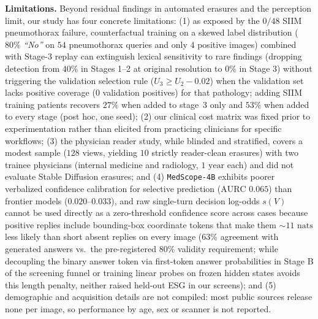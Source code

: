 \documentclass[5p,times,twocolumn,authoryear]{elsarticle}
\begin{document}
\textbf{Limitations.} Beyond residual findings in automated erasures and the perception limit, our study has four concrete limitations: (1) as exposed by the $0/48$ SIIM pneumothorax failure, counterfactual training on a skewed label distribution ($80\%$ \emph{``No''} on $54$ pneumothorax queries and only $4$ positive images) combined with Stage-3 replay can extinguish lexical sensitivity to rare findings (dropping detection from $40\%$ in Stages 1--2 at original resolution to $0\%$ in Stage 3) without triggering the validation selection rule ($U_3 \ge U_2 - 0.02$) when the validation set lacks positive coverage ($0$ validation positives) for that pathology; adding SIIM training patients recovers $27\%$ when added to stage~3 only and $53\%$ when added to every stage (post hoc, one seed); (2) our clinical cost matrix was fixed prior to experimentation rather than elicited from practicing clinicians for specific workflows; (3) the physician reader study, while blinded and stratified, covers a modest sample ($128$ views, yielding $10$ strictly reader-clean erasures) with two trainee physicians (internal medicine and radiology, $1\text{ year}$ each) and did not evaluate Stable Diffusion erasures; and (4) \texttt{MedScope-4B} exhibits poorer verbalized confidence calibration for selective prediction ($\text{AURC } 0.065$) than frontier models ($0.020\text{--}0.033$), and raw single-turn decision log-odds $s(V)$ cannot be used directly as a zero-threshold confidence score across cases because positive replies include bounding-box coordinate tokens that make them $\sim 11\text{ nats}$ less likely than short absent replies on every image ($63\%$ agreement with generated answers vs.\ the pre-registered $80\%$ validity requirement; while decoupling the binary answer token via first-token answer probabilities in Stage B of the screening funnel or training linear probes on frozen hidden states avoids this length penalty, neither raised held-out ESG in our screens); and (5) demographic and acquisition details are not compiled: most public sources release none per image, so performance by age, sex or scanner is not reported.
\end{document}
